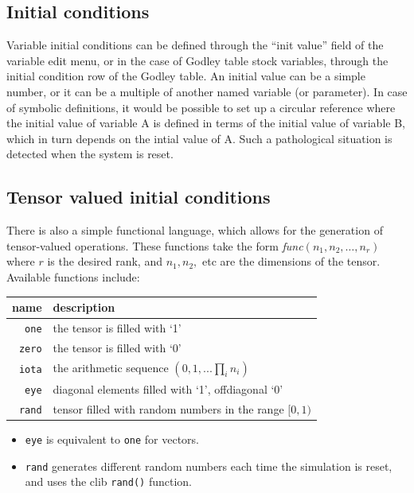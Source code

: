 \subsection{Initial conditions}\label{var:init}

Variable initial conditions can be defined through the ``init value''
field of the variable edit menu, or in the case of Godley table stock
variables, through the initial condition row of the Godley table. An
initial value can be a simple number, or it can be a multiple of
another named variable (or parameter). In case of symbolic
definitions, it would be possible to set up a circular reference where
the initial value of variable A is defined in terms of the initial
value of variable B, which in turn depends on the intial value of
A. Such a pathological situation is detected when the system is reset.

\subsection{Tensor valued initial conditions}\label{tensor-init}

There is also a simple functional language, which allows for the
generation of tensor-valued operations. These functions take the form
{\em func}$(n_1,n_2,\ldots,n_r)$ where $r$ is the desired rank, and
$n_1,n_2,$ etc are the dimensions of the tensor. Available
functions include:

\begin{tabular}{|r|l|}
  \hline
  name & description\\\hline
  \verb+one+ & the tensor is filled with `1'\\
  \verb+zero+ & the tensor is filled with `0'\\
  \verb+iota+ & the arithmetic sequence $(0,1,...\prod_in_i)$\\
  \verb+eye+ & diagonal elements filled with `1', offdiagonal `0'\\
  \verb+rand+ & tensor filled with random numbers in the range $[0,1)$\\
  \hline
\end{tabular}

\begin{itemize}
\item \verb+eye+ is equivalent to \verb+one+ for vectors.
\item \verb+rand+ generates different random numbers each time the simulation
  is reset, and uses the clib \verb+rand()+ function.
\end{itemize}


